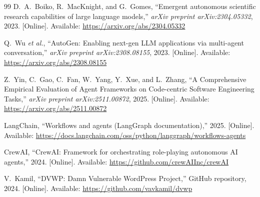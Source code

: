 \documentclass[sigconf,anonymous]{acmart}
\begin{document}
\begin{thebibliography}{99}
D.~A.~Boiko, R.~MacKnight, and G.~Gomes, ``Emergent autonomous scientific research capabilities of large language models,''
\emph{arXiv preprint arXiv:2304.05332}, 2023. [Online]. Available: \url{https://arxiv.org/abs/2304.05332}

Q.~Wu \emph{et al.}, ``AutoGen: Enabling next-gen LLM applications via multi-agent conversation,''
\emph{arXiv preprint arXiv:2308.08155}, 2023. [Online]. Available: \url{https://arxiv.org/abs/2308.08155}

Z.~Yin, C.~Gao, C.~Fan, W.~Yang, Y.~Xue, and L.~Zhang, ``A Comprehensive Empirical Evaluation of Agent Frameworks on Code-centric Software Engineering Tasks,''
\emph{arXiv preprint arXiv:2511.00872}, 2025. [Online]. Available: \url{https://arxiv.org/abs/2511.00872}

LangChain, ``Workflows and agents (LangGraph documentation),'' 2025.
[Online]. Available: \url{https://docs.langchain.com/oss/python/langgraph/workflows-agents}

CrewAI, ``CrewAI: Framework for orchestrating role-playing autonomous AI agents,'' 2024.
[Online]. Available: \url{https://github.com/crewAIInc/crewAI}

V.~Kamil, ``DVWP: Damn Vulnerable WordPress Project,'' GitHub repository, 2024.
[Online]. Available: \url{https://github.com/vavkamil/dvwp}


\end{thebibliography}
\end{document}
